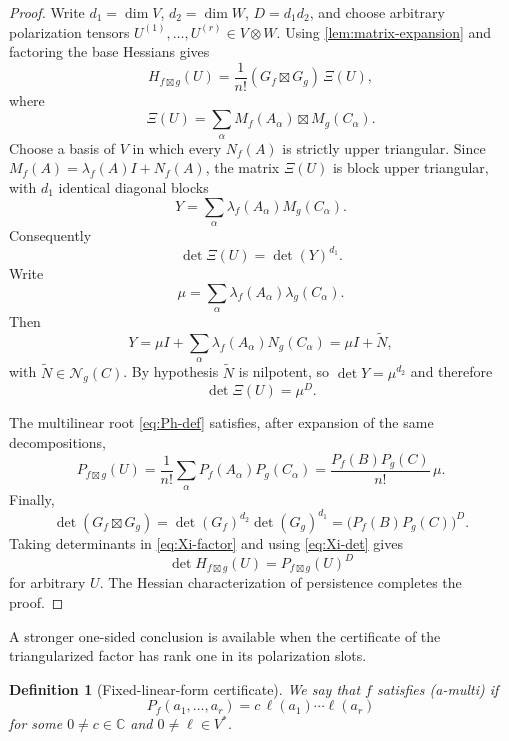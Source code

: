 \documentclass[11pt]{amsart}
\newtheorem{definition}[theorem]{Definition}
\newcommand{\C}{\mathbb C}
\newcommand{\boxt}{\mathbin{\boxtimes}}
\newcommand{\Nsp}{\mathcal N}
\begin{document}
\begin{proof}
Write $d_1=\dim V$, $d_2=\dim W$, $D=d_1d_2$, and choose arbitrary
polarization tensors $U^{(1)},\ldots,U^{(r)}\in V\otimes W$.  Using
\cref{lem:matrix-expansion} and factoring the base Hessians gives
\begin{equation}\label{eq:Xi-factor}
 H_{f\boxt g}(U)=\frac1{n!}(G_f\boxt G_g)\,\Xi(U),
\end{equation}
where
\[
 \Xi(U)=\sum_\alpha M_f(A_\alpha)\boxt M_g(C_\alpha).
\]
Choose a basis of $V$ in which every $N_f(A)$ is strictly upper triangular.
Since
$M_f(A)=\lambda_f(A)I+N_f(A)$, the matrix $\Xi(U)$ is block upper
triangular, with $d_1$ identical diagonal blocks
\begin{equation}\label{eq:Y-def}
 Y=\sum_\alpha \lambda_f(A_\alpha)M_g(C_\alpha).
\end{equation}
Consequently
\[
 \det\Xi(U)=\det(Y)^{d_1}.
\]
Write
\[
 \mu=\sum_\alpha\lambda_f(A_\alpha)\lambda_g(C_\alpha).
\]
Then
\[
 Y=\mu I+
 \sum_\alpha\lambda_f(A_\alpha)N_g(C_\alpha)
   =\mu I+\widetilde N,
\]
with $\widetilde N\in\Nsp_g(C)$.  By hypothesis $\widetilde N$ is nilpotent,
so $\det Y=\mu^{d_2}$ and therefore
\begin{equation}\label{eq:Xi-det}
 \det\Xi(U)=\mu^D.
\end{equation}

The multilinear root \eqref{eq:Ph-def} satisfies, after expansion of the same
decompositions,
\[
 P_{f\boxt g}(U)
 =\frac1{n!}\sum_\alpha P_f(A_\alpha)P_g(C_\alpha)
 =\frac{P_f(B)P_g(C)}{n!}\,\mu.
\]
Finally,
\[
 \det(G_f\boxt G_g)
 =\det(G_f)^{d_2}\det(G_g)^{d_1}
 =\big(P_f(B)P_g(C)\big)^D.
\]
Taking determinants in \eqref{eq:Xi-factor} and using
\eqref{eq:Xi-det} gives
\[
 \det H_{f\boxt g}(U)=P_{f\boxt g}(U)^D
\]
for arbitrary $U$.  The Hessian characterization of persistence
\cite[Theorem~2(c)]{GO25} completes the proof.
\end{proof}

A stronger one-sided conclusion is available when the certificate of the
triangularized factor has rank one in its polarization slots.

\begin{definition}[Fixed-linear-form certificate]
We say that $f$ satisfies \emph{(a-multi)} if
\begin{equation}\label{eq:a-multi}
 P_f(a_1,\ldots,a_r)=c\,\ell(a_1)\cdots\ell(a_r)
\end{equation}
for some $0\neq c\in\C$ and $0\neq\ell\in V^*$.
\end{definition}
\end{document}
